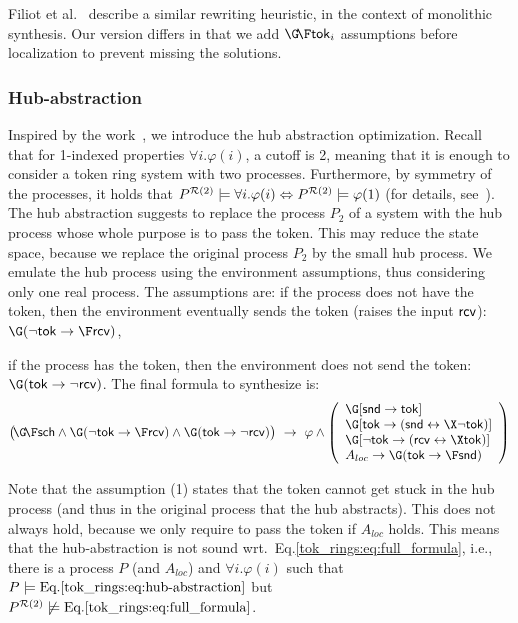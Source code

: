 \- Filiot et al.~\cite{Filiot11} describe a similar rewriting heuristic,
   in the context of monolithic synthesis.
   Our version differs in that we add $\GF\token_i$ assumptions
   before localization to prevent missing the solutions.

\il


\subsubsection{Hub-abstraction}

  Inspired by the work~\cite{Clarke04c}, we introduce the hub abstraction optimization.
  Recall that for 1-indexed properties $\forall i.\varphi(i)$, a cutoff is 2,
  meaning that it is enough to consider a token ring system with two processes.
  Furthermore, by symmetry of the processes,
  it holds that
  $P^{\mathcal {R}(2)}\models \forall i. \varphi(i) \Leftrightarrow P^{\mathcal {R}(2)} \models \varphi(1)$
  (for details, see~\cite{Emerso03}).
  The hub abstraction suggests to replace the process $P_2$ of a system with the hub process
  whose whole purpose is to pass the token.
  This may reduce the state space,
  because we replace the original process $P_2$ by the small hub process.
  We emulate the hub process using the environment assumptions,
  thus considering only one real process.
  The assumptions are:
  \li
  \-[(1)]
     if the process does not have the token,
     then the environment eventually sends the token (raises the input $\mathsf{rcv}$):
     $\G ( \neg \token \impl \F \trcv)$,

  \-[(2)]
     if the process has the token, then the environment does not send the token:
     $\G ( \token \impl \neg\trcv )$.
  \il
  The final formula to synthesize is:
  \begin{equation}\label{tok_rings:eq:hub-abstraction}
  \big(\!\GF\sch \land \G(\neg\token \impl \F\trcv) \land \G(\token \impl \neg\trcv)\big)
  ~\impl~
    \varphi \land \left(
     \begin{array}{l}
       \G [\tsnd \impl \token] \\
       \G [\token \impl (\tsnd \iff \X\neg\token)] \\
       \G [\neg\token \impl (\trcv \iff \X\token)] \\
       A_{loc} \impl \G(\token \impl \F \tsnd)
     \end{array}
     \right)
  \end{equation}

  Note that the assumption (1) states that the token cannot get stuck
  in the hub process (and thus in the original process that the hub abstracts).
  This does not always hold,
  because we only require to pass the token if $A_{loc}$ holds.
  This means that the hub-abstraction is not sound wrt.\ Eq.\ref{tok_rings:eq:full_formula},
  i.e.,
  there is a process $P$ (and $A_{loc}$) and $\forall i.\varphi(i)$ such that
  $P \models \text{Eq.\ref{tok_rings:eq:hub-abstraction}}$
  but $P^{\mathcal {R}(2)} \not\models \text{Eq.\ref{tok_rings:eq:full_formula}}$.

